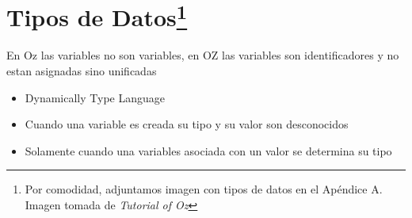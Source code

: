 \documentclass[10pt,journal,compsoc]{IEEEtran}
\begin{document}
\section{Tipos de Datos\protect\footnote{Por comodidad, adjuntamos imagen con tipos de datos en el Ap\'endice A. Imagen tomada de \emph{Tutorial of Oz}}}
En Oz las variables no son variables, en OZ las variables son identificadores y no estan asignadas sino unificadas
\begin{itemize}
	\item Dynamically Type Language
	\item Cuando una variable es creada su tipo y su valor son desconocidos
	\item Solamente cuando una variables asociada con un valor se determina su tipo
\end{itemize}
\end{document}
